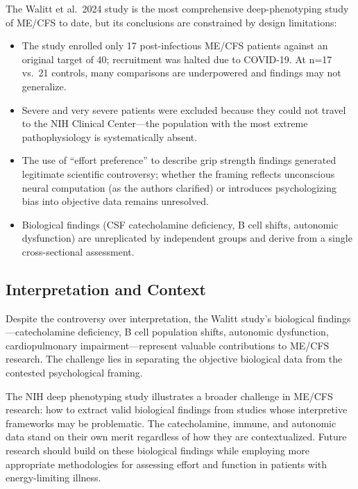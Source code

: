 \begin{limitation}
The Walitt et al.\ 2024 study is the most comprehensive deep-phenotyping study of ME/CFS to date, but its conclusions are constrained by design limitations:
\begin{itemize}
    \item The study enrolled only 17 post-infectious ME/CFS patients against an original target of 40; recruitment was halted due to COVID-19. At n=17 vs.\ 21 controls, many comparisons are underpowered and findings may not generalize.
    \item Severe and very severe patients were excluded because they could not travel to the NIH Clinical Center---the population with the most extreme pathophysiology is systematically absent.
    \item The use of ``effort preference'' to describe grip strength findings generated legitimate scientific controversy; whether the framing reflects unconscious neural computation (as the authors clarified) or introduces psychologizing bias into objective data remains unresolved.
    \item Biological findings (CSF catecholamine deficiency, B cell shifts, autonomic dysfunction) are unreplicated by independent groups and derive from a single cross-sectional assessment.
\end{itemize}
\end{limitation}

\subsection{Interpretation and Context}

Despite the controversy over interpretation, the Walitt study's biological findings---catecholamine deficiency, B cell population shifts, autonomic dysfunction, cardiopulmonary impairment---represent valuable contributions to ME/CFS research. The challenge lies in separating the objective biological data from the contested psychological framing.

\begin{open_question}
The NIH deep phenotyping study illustrates a broader challenge in ME/CFS research: how to extract valid biological findings from studies whose interpretive frameworks may be problematic. The catecholamine, immune, and autonomic data stand on their own merit regardless of how they are contextualized. Future research should build on these biological findings while employing more appropriate methodologies for assessing effort and function in patients with energy-limiting illness.
\end{open_question}

